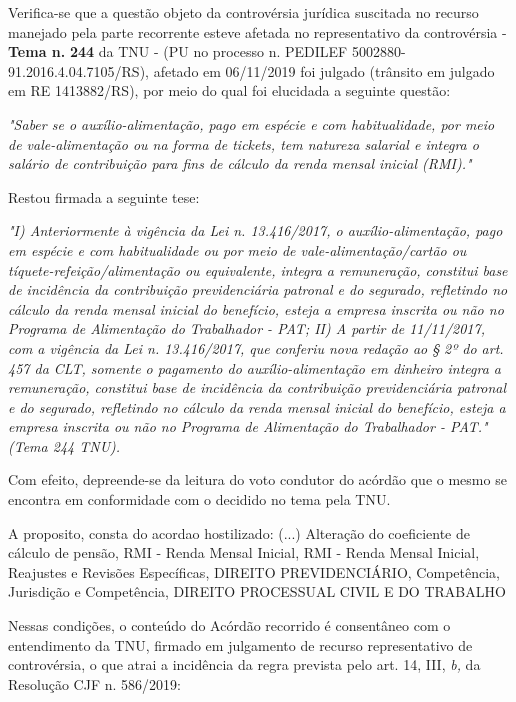 \documentclass[12pt]{article}
\begin{document}
\justifying
\noindent Verifica-se que a questão objeto da controvérsia jurídica suscitada no recurso manejado pela parte recorrente esteve afetada no representativo da controvérsia - \textbf{Tema n. }\textbf{244} da TNU - (PU no processo n. PEDILEF 5002880-91.2016.4.04.7105/RS),  afetado em 06/11/2019 foi julgado (trânsito em julgado em RE 1413882/RS), por meio do qual foi elucidada a seguinte questão:

\noindent \textit{"Saber se o auxílio-alimentação, pago em espécie e com habitualidade, por meio de vale-alimentação ou na forma de tickets, tem natureza salarial e integra o salário de contribuição para fins de cálculo da renda mensal inicial (RMI)."}

\noindent Restou firmada a seguinte tese:

\noindent \textit{"I) Anteriormente à vigência da Lei n. 13.416/2017, o auxílio-alimentação, pago em espécie e com habitualidade ou por meio de vale-alimentação/cartão ou tíquete-refeição/alimentação ou equivalente, integra a remuneração, constitui base de incidência da contribuição previdenciária patronal e do segurado, refletindo no cálculo da renda mensal inicial do benefício, esteja a empresa inscrita ou não no Programa de Alimentação do Trabalhador - PAT; II) A partir de 11/11/2017, com a vigência da Lei n. 13.416/2017, que conferiu nova redação ao § 2º do art. 457 da CLT, somente o pagamento do auxílio-alimentação em dinheiro integra a remuneração, constitui base de incidência da contribuição previdenciária patronal e do segurado, refletindo no cálculo da renda mensal inicial do benefício, esteja a empresa inscrita ou não no Programa de Alimentação do Trabalhador - PAT." (Tema 244 TNU).}

\noindent Com efeito, depreende-se da leitura do voto condutor do acórdão que o mesmo se encontra em conformidade com o decidido no  tema pela TNU.

\noindent A proposito, consta do acordao hostilizado: (...) Alteração do coeficiente de cálculo de pensão, RMI - Renda Mensal Inicial, RMI - Renda Mensal Inicial, Reajustes e Revisões Específicas, DIREITO PREVIDENCIÁRIO, Competência, Jurisdição e Competência, DIREITO PROCESSUAL CIVIL E DO TRABALHO

\noindent Nessas condições, o conteúdo do Acórdão recorrido é consentâneo com o entendimento da TNU, firmado em julgamento de recurso representativo de controvérsia, o que atrai a incidência da regra prevista pelo art. 14, III, \textit{b,} da Resolução CJF n. 586/2019:
\end{document}
